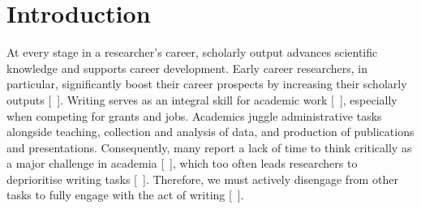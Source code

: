 \documentclass[10pt,letterpaper]{article}
\begin{document}



\linenumbers

\section*{Introduction}

At every stage in a researcher's career, scholarly output advances scientific knowledge and supports career development. Early career researchers, in particular, significantly boost their career prospects by increasing their scholarly outputs [~\cite{horta2016, wilkins2021}]. Writing serves as an integral skill for academic work [~\cite{boice1984, hazelett2025}], especially when competing for grants and jobs. Academics juggle administrative tasks alongside teaching, collection and analysis of data, and production of publications and presentations. Consequently, many report a lack of time to think critically as a major challenge in academia [~\cite{menzies2007}], which too often leads researchers to deprioritise writing tasks [~\cite{boice1984, menzies2007}]. Therefore, we must actively disengage from other tasks to fully engage with the act of writing [~\cite{murray2009, murray2013}].
\end{document}
